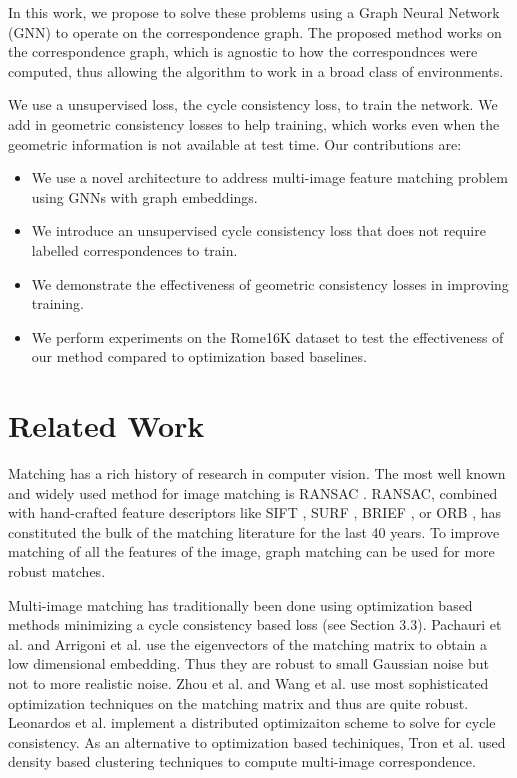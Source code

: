 \documentclass[10pt,twocolumn,letterpaper]{article}
\begin{document}
In this work, we propose to solve these problems using a Graph Neural Network (GNN) to operate on the correspondence graph.
The proposed method works on the correspondence graph, which is agnostic to how the correspondnces were computed, thus allowing the algorithm to work in a broad class of environments.

We use a unsupervised loss, the cycle consistency loss, to train the network.
We add in geometric consistency losses to help training, which works even when the geometric information is not available at test time.
Our contributions are:
\begin{itemize}
\item We use a novel architecture to address multi-image feature matching problem using GNNs with graph embeddings.
\item We introduce an unsupervised cycle consistency loss that does not require labelled correspondences to train.
\item We demonstrate the effectiveness of geometric consistency losses in improving training.
\item We perform experiments on the Rome16K \cite{li2010location} dataset to test the effectiveness of our method compared to optimization based baselines.
\end{itemize}


\section{Related Work}

Matching has a rich history of research in computer vision.
The most well known and widely used method for image matching is RANSAC \cite{fischler1981random}.
RANSAC, combined with hand-crafted feature descriptors like SIFT \cite{lowe2004distinctive}, SURF \cite{bay2006surf}, BRIEF \cite{calonder2012brief}, or ORB \cite{mur2015orb}, has constituted the bulk of the matching literature for the last 40 years.
To improve matching of all the features of the image, graph matching \cite{suh2015subgraph, hu2016distributable} can be used for more robust matches.

Multi-image matching has traditionally been done using optimization based methods minimizing a cycle consistency based loss (see Section 3.3).
Pachauri et al. \cite{pachauri2013solving} and Arrigoni et al. \cite{arrigoni2017synchronization} use the eigenvectors of the matching matrix to obtain a low dimensional embedding. 
Thus they are robust to small Gaussian noise but not to more realistic noise.
Zhou et al. \cite{zhou2015multi} and Wang et al. \cite{wang2017multi} use most sophisticated optimization techniques on the matching matrix and thus are quite robust.
Leonardos et al. \cite{leonardos2016distributed} implement a distributed optimizaiton scheme to solve for cycle consistency.
As an alternative to optimization based techiniques, Tron et al. \cite{tron2017fast} used density based clustering techniques to compute multi-image correspondence.
\end{document}
